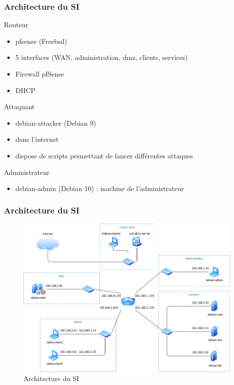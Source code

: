 \documentclass{beamer}
\begin{document}
		\begin{frame}
			\frametitle{Architecture du SI}
			\begin{block}{Routeur}
				\begin{itemize}
					\item pfsense (Freebsd)
					\item 5 interfaces (WAN, administration, dmz, clients, services)
					\item Firewall pfSense
					\item DHCP
				\end{itemize}
			\end{block}
			\begin{block}{Attaquant}
				\begin{itemize}
					\item debian-attacker (Debian 9)
					\item dans l'internet
					\item dispose de scripts permettant de lancer différentes attaques
				\end{itemize}
			\end{block}
			\begin{block}{Administrateur}
				\begin{itemize}
					\item debian-admin (Debian 10) : machine de l'administrateur
				\end{itemize}
			\end{block}
		\end{frame}
		\begin{frame}
			\frametitle{Architecture du SI}
			\begin{center}
				\begin{figure}
					\includegraphics[scale=.3]{si.png}
					\caption{Architecture du SI}
				\end{figure}
			\end{center}
		\end{frame}
\end{document}
